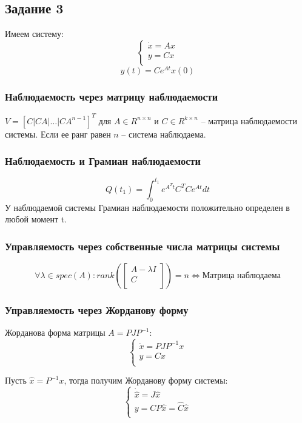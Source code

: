 \subsection{Задание 3}
Имеем систему:
\[
\begin{cases}
    \dot{x} = A x \\
    y = Cx  \\
\end{cases}
\]
\[
        y(t) = C e^{At} x(0)
\]
\subsubsection{Наблюдаемость через матрицу наблюдаемости}
\(V = [C | CA | \hdots | CA^{n-1}]^T\) для \(A \in R^{n \times n}\) и \(C \in R^{k \times n}\) -- матрица наблюдаемости системы. Если ее ранг равен \(n\) -- система наблюдаема.

\subsubsection{Наблюдаемость и Грамиан наблюдаемости}
\[Q(t_1) = \int_0^{t_1} e^{A^T t} C^T C e^{A t} dt\]
У наблюдаемой системы Грамиан наблюдаемости положительно определен в любой момент t.

\subsubsection{Управляемость через собственные числа матрицы системы}
\[\forall \lambda \in spec(A): rank(\begin{bmatrix}
        A - \lambda I  \\
        C \\
        \end{bmatrix}) = n \Longleftrightarrow \text{Матрица наблюдаема} \]

\subsubsection{Управляемость через Жорданову форму}
Жорданова форма матрицы \(A = P J P^{-1}\):
\[
        \begin{cases}
                \dot{x} = P J P^{-1} x \\
                y = Cx  \\
        \end{cases}
\]

Пусть \(\hat{x} = P^{-1}x\), тогда получим Жорданову форму системы:
\[
        \begin{cases}
                \dot{\hat{x}} = J\hat{x} \\
                y = CP\hat{x} = \hat{C}\hat{x} \\
        \end{cases}
\]

